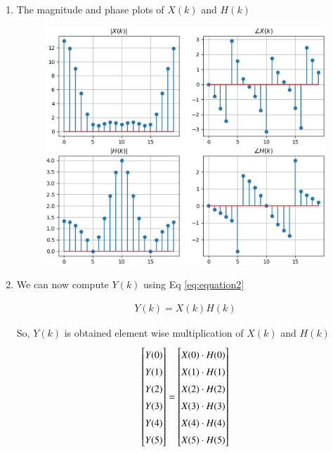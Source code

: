 \documentclass[journal,12pt,twocolumn]{IEEEtran}
\renewcommand\thesection{\arabic{section}}
\begin{document}
\begin{enumerate}[label=\thesection.\arabic*.,ref=\thesection.\theenumi]
\item The magnitude and phase plots of $X(k)$ and $H(k)$
\begin{figure}[!ht]
	\includegraphics[width=1.15\columnwidth]{./figs/ee18btech11017_fig1.eps}
\end{figure}

\item We can now compute $Y(k)$ using 	Eq \eqref{eq:equation2}

\begin{align}
    Y(k) = X(k)H(k)
    \label{eq:equation2}
\end{align}

So, $Y(k)$ is obtained element wise multiplication of $X(k)$ and $H(k)$
\begin{equation}
\renewcommand{\arraystretch}{1.45}
\setlength\arraycolsep{0.01pt}
\begin{bmatrix} 
Y(0) \\ Y(1) \\ Y(2) \\ Y(3) \\ Y(4) \\ Y(5) 
\end{bmatrix}
=
\begin{bmatrix}
X(0)\cdot H(0) \\ X(1)\cdot H(1) \\ X(2)\cdot H(2) \\ X(3)\cdot H(3) \\ X(4)\cdot H(4) \\ X(5)\cdot H(5)
\end{bmatrix}
\end{equation}


\end{enumerate}
\end{document}
